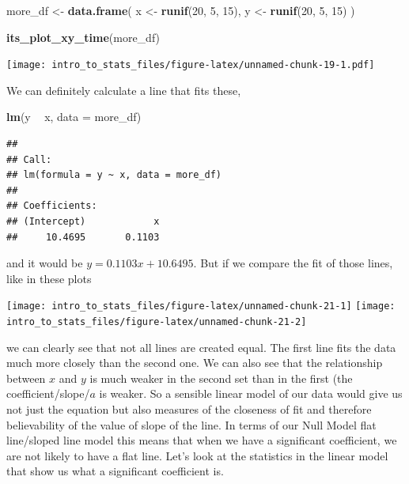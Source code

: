 \documentclass[
]{book}
\newenvironment{Shaded}{\begin{snugshade}}{\end{snugshade}}
\newcommand{\DataTypeTok}[1]{\textcolor[rgb]{0.13,0.29,0.53}{#1}}
\newcommand{\DecValTok}[1]{\textcolor[rgb]{0.00,0.00,0.81}{#1}}
\newcommand{\KeywordTok}[1]{\textcolor[rgb]{0.13,0.29,0.53}{\textbf{#1}}}
\newcommand{\NormalTok}[1]{#1}
\newcommand{\OperatorTok}[1]{\textcolor[rgb]{0.81,0.36,0.00}{\textbf{#1}}}
\newcommand{\StringTok}[1]{\textcolor[rgb]{0.31,0.60,0.02}{#1}}
\begin{document}
\begin{Shaded}
\begin{Highlighting}[]
\NormalTok{more_df <-}\StringTok{ }\KeywordTok{data.frame}\NormalTok{(}
\NormalTok{  x <-}\StringTok{ }\KeywordTok{runif}\NormalTok{(}\DecValTok{20}\NormalTok{, }\DecValTok{5}\NormalTok{, }\DecValTok{15}\NormalTok{),}
\NormalTok{  y <-}\StringTok{ }\KeywordTok{runif}\NormalTok{(}\DecValTok{20}\NormalTok{, }\DecValTok{5}\NormalTok{, }\DecValTok{15}\NormalTok{)}
\NormalTok{)}

\KeywordTok{its_plot_xy_time}\NormalTok{(more_df)}
\end{Highlighting}
\end{Shaded}

\texttt{[image: intro\_to\_stats\_files/figure-latex/unnamed-chunk-19-1.pdf]}

We can definitely calculate a line that fits these,

\begin{Shaded}
\begin{Highlighting}[]
\KeywordTok{lm}\NormalTok{(y }\OperatorTok{~}\StringTok{ }\NormalTok{x, }\DataTypeTok{data =}\NormalTok{ more_df)}
\end{Highlighting}
\end{Shaded}

\begin{verbatim}
## 
## Call:
## lm(formula = y ~ x, data = more_df)
## 
## Coefficients:
## (Intercept)            x  
##     10.4695       0.1103
\end{verbatim}

and it would be \(y = 0.1103x + 10.6495\). But if we compare the fit of those lines, like in these plots

\texttt{[image: intro\_to\_stats\_files/figure-latex/unnamed-chunk-21-1]} \texttt{[image: intro\_to\_stats\_files/figure-latex/unnamed-chunk-21-2]}

we can clearly see that not all lines are created equal. The first line fits the data much more closely than the second one. We can also see that the relationship between \(x\) and \(y\) is much weaker in the second set than in the first (the coefficient/slope/\(a\) is weaker. So a sensible linear model of our data would give us not just the equation but also measures of the closeness of fit and therefore believability of the value of slope of the line. In terms of our Null Model flat line/sloped line model this means that when we have a significant coefficient, we are not likely to have a flat line. Let's look at the statistics in the linear model that show us what a significant coefficient is.
\end{document}
